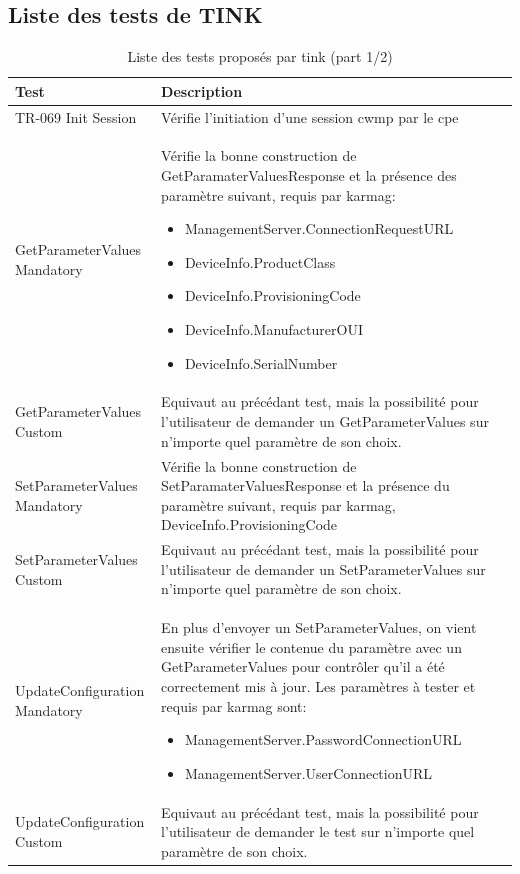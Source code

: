 \documentclass[12pt,a4paper]{report}
\begin{document}
\begin{appendix}
\chapter{Liste des tests de TINK}
\begin{table}
	\begin{tabularx}{17cm}{|l|X|}
		\hline
		Test & Description\tabularnewline
		\hline
		TR-069 Init Session & Vérifie l'initiation d'une session \gls{cwmp} par le \gls{cpe}\tabularnewline
		\hline
		GetParameterValues Mandatory & Vérifie la bonne construction de GetParamaterValuesResponse et la présence des paramètre suivant, requis par \gls{karmag}: 
		\begin{itemize}
		\item ManagementServer.ConnectionRequestURL
		\item DeviceInfo.ProductClass
		\item DeviceInfo.ProvisioningCode
		\item DeviceInfo.ManufacturerOUI
		\item DeviceInfo.SerialNumber
		\end{itemize}		\tabularnewline		
		\hline
		GetParameterValues Custom & Equivaut au précédant test, mais la possibilité pour l'utilisateur de demander un GetParameterValues sur n'importe quel paramètre de son choix.\tabularnewline
		\hline
		SetParameterValues Mandatory & Vérifie la bonne construction de SetParamaterValuesResponse et la présence du paramètre suivant, requis par \gls{karmag}, DeviceInfo.ProvisioningCode\tabularnewline
		\hline
		SetParameterValues Custom & Equivaut au précédant test, mais la possibilité pour l'utilisateur de demander un SetParameterValues sur n'importe quel paramètre de son choix.\tabularnewline
		\hline
		UpdateConfiguration Mandatory & En plus d'envoyer un SetParameterValues, on vient ensuite vérifier le contenue du paramètre avec un GetParameterValues pour contrôler qu'il a été correctement mis à jour. Les paramètres à tester et requis par \gls{karmag} sont: 
		\begin{itemize}
		\item ManagementServer.PasswordConnectionURL
		\item ManagementServer.UserConnectionURL
		\end{itemize} \tabularnewline
		\hline
		UpdateConfiguration Custom & Equivaut au précédant test, mais la possibilité pour l'utilisateur de demander le test sur n'importe quel paramètre de son choix.\tabularnewline
		\hline
		\hline
		\end{tabularx}
	\centering
	\caption{Liste des tests proposés par \gls{tink} (part 1/2)}
\end{table}


\end{appendix}
\end{document}

